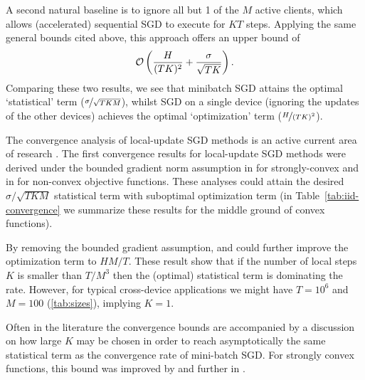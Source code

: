 A second natural baseline is to ignore all but 1 of the $M$ active clients, which allows (accelerated) sequential SGD to execute for $K T$ steps. Applying the same general bounds cited above, this approach offers an upper bound of
\[
 \mathcal{O}\left( \frac{H}{(TK)^2} + \frac{\sigma}{\sqrt{TK}}\right).
\]
Comparing these two results, we see that minibatch SGD attains the optimal `statistical' term ($\nicefrac{\sigma}{\sqrt{TKM}}$), whilst SGD on a single device (ignoring the updates of the other devices) achieves the optimal `optimization' term ($\nicefrac{H}{(TK)^2}$). 

The convergence analysis of local-update SGD methods is an active current area of research \citep{stich2018local, lin2018don, yu2018parallel, wang2018cooperative, reisizadeh2019fedpaq,patel19communication,khaled2019better,woodworth2020local}. 
The first convergence results for local-update SGD methods were derived under the bounded gradient norm  assumption in \citet{stich2018local} for strongly-convex and in \citet{yu2018parallel} for non-convex objective functions. These analyses could attain the desired $\sigma/\sqrt{TKM}$ statistical term with suboptimal optimization term (in Table~\ref{tab:iid-convergence} we summarize these results for the middle ground of convex functions).

By removing the bounded gradient assumption, \citet{wang2018cooperative} and \citet{stich2019error} could further improve the optimization term to $HM/T$. These result show that if the number of local steps $K$ is smaller than $T/M^3$ then the (optimal) statistical term is dominating the rate. However, for typical cross-device applications we might have $T=10^6$ and $M=100$ (\cref{tab:sizes}), implying $K=1$.

Often in the literature the convergence bounds are accompanied by a discussion on how large $K$ may be chosen in order to reach asymptotically the same statistical term as the  convergence rate of mini-batch SGD. For strongly convex functions, this bound was improved by \citet{khaled2019better} and further in \citet{stich2019error}.

